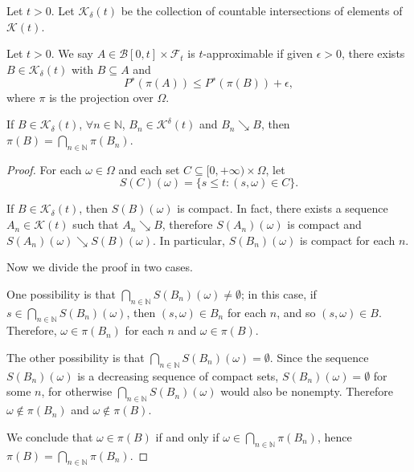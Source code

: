 \begin{definition}\label{def:count_inter_of_fin_union_RNN_times_measurable}
  \leanok
Let $t>0$. Let $\mathcal{K}_\delta(t)$ be the collection of countable intersections of elements of $\mathcal{K}(t)$.
\end{definition}

\begin{definition}\label{def:t_approx_set}
  \leanok
Let $t>0$.
We say $A \in \mathcal{B}[0, t] \times \mathcal{F}_t$ is
$t$-approximable if given $\epsilon > 0$, there exists $B \in \mathcal{K}_\delta (t)$ with $B \subseteq{} A$ and
$$P^∗ (\pi(A)) \leq P^∗ (\pi(B)) + \epsilon,$$
where $\pi$ is the projection over $\Omega$.
\end{definition}

\begin{lemma}\label{lem:iInf_snd_eq_snd_iInf}
  \leanok
If $B \in \mathcal{K}_\delta (t)$, $\forall n\in \mathbb{N}$, $B_n \in \mathcal{K}^\delta(t)$ and $B_n \searrow B$, then $\pi(B) = \bigcap_{n\in\mathbb{N}} \pi(B_n)$.
\end{lemma}

\begin{proof}

  For each $\omega \in \Omega$ and each set $C \subseteq [0,+\infty) \times \Omega$, let
  \[S(C)(\omega) = \{s \leq t : (s,\omega) \in C\}.\]

  If $B \in \mathcal{K}_\delta(t)$, then $S(B)(\omega)$
  is compact. In fact, there exists a sequence $A_n \in \mathcal{K}(t)$ such that
  $A_n \searrow B$, therefore $S(A_n)(\omega)$ is compact and $S(A_n)(\omega) \searrow S(B)(\omega)$. In particular, $S(B_n)(\omega)$ is compact for each $n$.

  Now we divide the proof in two cases.

  One possibility is that
  $\bigcap_{n \in \mathbb{N}} S(B_n)(\omega) \neq \emptyset$; in this case, if $s \in \bigcap_{n \in \mathbb{N}} S(B_n)(\omega)$,
  then $(s,\omega) \in B_n$ for each $n$, and so $(s,\omega) \in B$. Therefore,
  $\omega \in \pi(B_n)$ for each $n$ and $\omega \in \pi(B)$.

  The other possibility is that $\bigcap_{n \in \mathbb{N}} S(B_n)(\omega) = \emptyset$.
  Since the sequence $S(B_n)(\omega)$ is a decreasing sequence of compact sets,
    $S(B_n)(\omega) = \emptyset$ for some $n$,
  for otherwise $\bigcap_{n \in \mathbb{N}} S(B_n)(\omega)$ would also be nonempty.
  Therefore $\omega \notin \pi(B_n)$ and $\omega \notin \pi(B)$.

  We conclude that $\omega \in \pi(B)$ if and only if $\omega \in \bigcap_{n \in \mathbb{N}} \pi(B_n)$, hence $\pi(B) = \bigcap_{n \in \mathbb{N}} \pi(B_n)$.
\end{proof}

